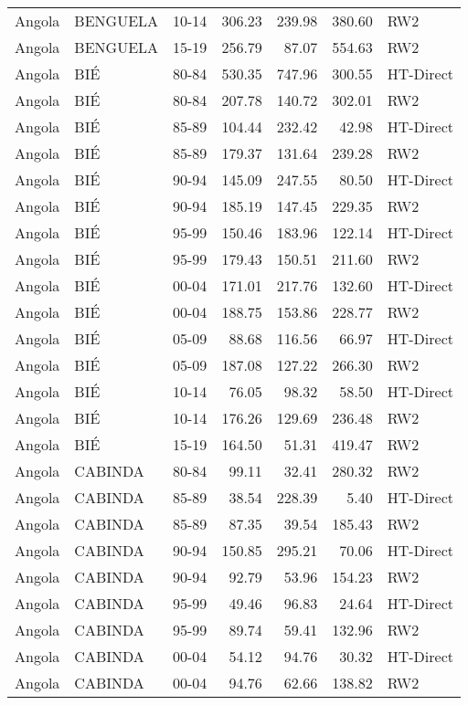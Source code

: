 \begin{longtable}{lllrrrl}
  Angola & BENGUELA & 10-14 & 306.23 & 239.98 & 380.60 & RW2 \\ 
  Angola & BENGUELA & 15-19 & 256.79 & 87.07 & 554.63 & RW2 \\ 
  Angola & BIÉ & 80-84 & 530.35 & 747.96 & 300.55 & HT-Direct \\ 
  Angola & BIÉ & 80-84 & 207.78 & 140.72 & 302.01 & RW2 \\ 
  Angola & BIÉ & 85-89 & 104.44 & 232.42 & 42.98 & HT-Direct \\ 
  Angola & BIÉ & 85-89 & 179.37 & 131.64 & 239.28 & RW2 \\ 
  Angola & BIÉ & 90-94 & 145.09 & 247.55 & 80.50 & HT-Direct \\ 
  Angola & BIÉ & 90-94 & 185.19 & 147.45 & 229.35 & RW2 \\ 
  Angola & BIÉ & 95-99 & 150.46 & 183.96 & 122.14 & HT-Direct \\ 
  Angola & BIÉ & 95-99 & 179.43 & 150.51 & 211.60 & RW2 \\ 
  Angola & BIÉ & 00-04 & 171.01 & 217.76 & 132.60 & HT-Direct \\ 
  Angola & BIÉ & 00-04 & 188.75 & 153.86 & 228.77 & RW2 \\ 
  Angola & BIÉ & 05-09 & 88.68 & 116.56 & 66.97 & HT-Direct \\ 
  Angola & BIÉ & 05-09 & 187.08 & 127.22 & 266.30 & RW2 \\ 
  Angola & BIÉ & 10-14 & 76.05 & 98.32 & 58.50 & HT-Direct \\ 
  Angola & BIÉ & 10-14 & 176.26 & 129.69 & 236.48 & RW2 \\ 
  Angola & BIÉ & 15-19 & 164.50 & 51.31 & 419.47 & RW2 \\ 
  Angola & CABINDA & 80-84 & 99.11 & 32.41 & 280.32 & RW2 \\ 
  Angola & CABINDA & 85-89 & 38.54 & 228.39 & 5.40 & HT-Direct \\ 
  Angola & CABINDA & 85-89 & 87.35 & 39.54 & 185.43 & RW2 \\ 
  Angola & CABINDA & 90-94 & 150.85 & 295.21 & 70.06 & HT-Direct \\ 
  Angola & CABINDA & 90-94 & 92.79 & 53.96 & 154.23 & RW2 \\ 
  Angola & CABINDA & 95-99 & 49.46 & 96.83 & 24.64 & HT-Direct \\ 
  Angola & CABINDA & 95-99 & 89.74 & 59.41 & 132.96 & RW2 \\ 
  Angola & CABINDA & 00-04 & 54.12 & 94.76 & 30.32 & HT-Direct \\ 
  Angola & CABINDA & 00-04 & 94.76 & 62.66 & 138.82 & RW2 \\ 

\end{longtable}
